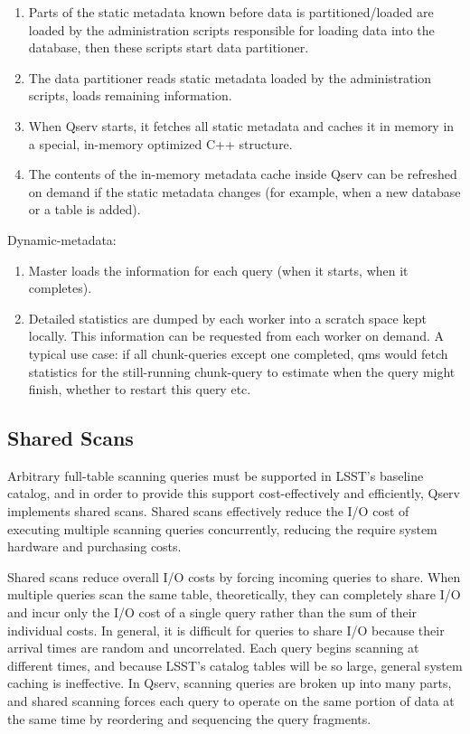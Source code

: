 \documentclass[DM,lsstdraft,toc]{lsstdoc}
\begin{document}
\begin{enumerate}
\def\labelenumi{\arabic{enumi}.}
\item
  Parts of the static metadata known before data is partitioned/loaded
  are loaded by the administration scripts responsible for loading data
  into the database, then these scripts start data partitioner.
\item
  The data partitioner reads static metadata loaded by the
  administration scripts, loads remaining information.
\item
  When Qserv starts, it fetches all static metadata and caches it in
  memory in a special, in-memory optimized C++ structure.
\item
  The contents of the in-memory metadata cache inside Qserv can be
  refreshed on demand if the static metadata changes (for example, when
  a new database or a table is added).
\end{enumerate}

Dynamic-metadata:

\begin{enumerate}
\def\labelenumi{\arabic{enumi}.}
\item
  Master loads the information for each query (when it starts, when it
  completes).
\item
  Detailed statistics are dumped by each worker into a scratch space
  kept locally. This information can be requested from each worker on
  demand. A typical use case: if all chunk-queries except one completed,
  qms would fetch statistics for the still-running chunk-query to
  estimate when the query might finish, whether to restart this query
  etc.
\end{enumerate}

\subsection{Shared Scans}\label{shared-scans}

Arbitrary full-table scanning queries must be supported in LSST's
baseline catalog, and in order to provide this support cost-effectively
and efficiently, Qserv implements shared scans. Shared scans effectively
reduce the I/O cost of executing multiple scanning queries
concurrently, reducing the require system hardware and purchasing costs.

Shared scans reduce overall I/O costs by forcing incoming queries to
share. When multiple queries scan the same table, theoretically, they
can completely share I/O and incur only the I/O cost of a single query
rather than the sum of their individual costs. In general, it is
difficult for queries to share I/O because their arrival times are
random and uncorrelated. Each query begins scanning at different times,
and because LSST's catalog tables will be so large, general system
caching is ineffective. In Qserv, scanning queries are broken up into
many parts, and shared scanning forces each query to operate on the same
portion of data at the same time by reordering and sequencing the query
fragments.
\end{document}
